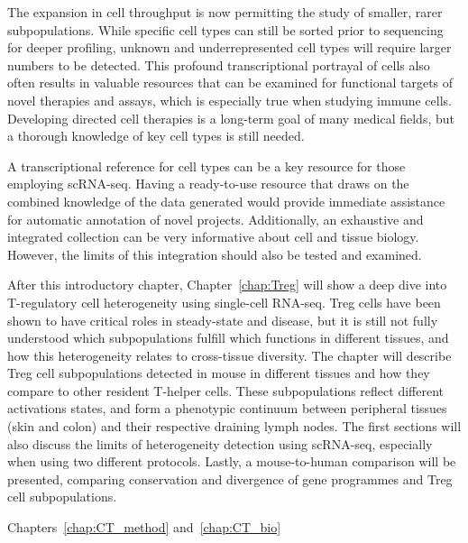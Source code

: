 The expansion in cell throughput is now permitting the study of smaller, rarer subpopulations. While specific cell types can still be sorted prior to sequencing for deeper profiling, unknown and underrepresented cell types will require larger numbers to be detected. This profound transcriptional portrayal of cells also often results in valuable resources that can be examined for functional targets of novel therapies and assays, which is especially true when studying immune cells. Developing directed cell therapies is a long-term goal of many medical fields, but a thorough knowledge of key cell types is still needed.

A transcriptional reference for cell types can be a key resource for those employing scRNA-seq. Having a ready-to-use resource that draws on the combined knowledge of the data generated would provide immediate assistance for automatic annotation of novel projects. Additionally, an exhaustive and integrated collection can be very informative about cell and tissue biology. However, the limits of this integration should also be tested and examined.

After this introductory chapter, Chapter~\ref{chap:Treg} will show a deep dive into T-regulatory cell heterogeneity using single-cell RNA-seq. Treg cells have been shown to have critical roles in steady-state and disease, but it is still not fully understood which subpopulations fulfill which functions in different tissues, and how this heterogeneity relates to cross-tissue diversity. The chapter will describe Treg cell subpopulations detected in mouse in different tissues and how they compare to other resident T-helper cells. These subpopulations reflect different activations states, and form a phenotypic continuum between peripheral tissues (skin and colon) and their respective draining lymph nodes. The first sections will also discuss the limits of heterogeneity detection using scRNA-seq, especially when using two different protocols. Lastly, a mouse-to-human comparison will be presented, comparing conservation and divergence of gene programmes and Treg cell subpopulations.

Chapters~\ref{chap:CT_method} and~\ref{chap:CT_bio}